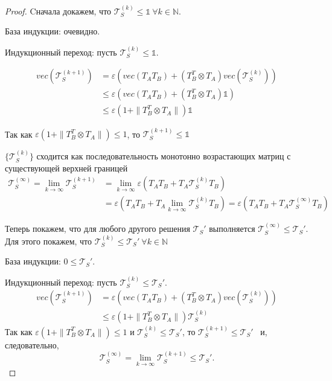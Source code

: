 \documentclass[12pt]{matmex-diploma-custom}
\begin{document}
\begin{proof}
Cначала докажем, что $\mathcal{T}_S^{(k)} \leq \mathds{1} \ \forall k \in \mathbb{N}$.

База индукции: очевидно.

Индукционный переход: пусть $\mathcal{T}_S^{(k)} \leq  \mathds{1}$.

\begin{align*}
    vec(\mathcal{T}_S^{(k+1)}) &= \varepsilon (vec(T_AT_B) + (T_B^T \otimes T_A)vec(\mathcal{T}_S^{(k)})) \\
    & \leq \varepsilon (vec(T_AT_B) + (T_B^T \otimes T_A) \mathds{1}) \\
    & \leq \varepsilon (1 + \| T_B^T \otimes T_A\|) \mathds{1}
\end{align*}

Так как $\varepsilon (1 + \| T_B^T \otimes T_A\|) \leq 1$, то $\mathcal{T}_S^{(k+1)} \leq \mathds{1}$

$\{ \mathcal{T}_S^{(k)}\}$ сходится как последовательность монотонно возрастающих матриц с существующей верхней границей 
\begin{align*}
\mathcal{T}_S^{(\infty)} = \lim_{k \to \infty} \mathcal{T}_S^{(k+1)} &= \lim_{k \to \infty}  \varepsilon (T_AT_B + T_A\mathcal{T}_S^{(k)} T_B) \\
&= \varepsilon (T_AT_B + T_A\lim_{k \to \infty}\mathcal{T}_S^{(k)} T_B) = \varepsilon (T_AT_B + T_A\mathcal{T}_S^{(\infty)} T_B)
\end{align*}

Теперь покажем, что для любого другого решения $\mathcal{T}_S'$ выполняется $\mathcal{T}_S^{(\infty)} \leq \mathcal{T}_S'$. Для этого покажем, что $\mathcal{T}_S^{(k)} \leq \mathcal{T}_S' \ \forall k \in \mathbb{N}$

База индукции: $0 \leq \mathcal{T}_S'$.

Индукционный переход: пусть $\mathcal{T}_S^{(k)} \leq  \mathcal{T}_S'$.
\begin{align*}
    vec(\mathcal{T}_S^{(k+1)}) &= \varepsilon (vec(T_AT_B) + (T_B^T \otimes T_A)vec(\mathcal{T}_S^{(k)})) \\
    & \leq \varepsilon (1 + \| T_B^T \otimes T_A\|) \mathcal{T}_S^{(k)}
\end{align*}
Так как $\varepsilon (1 + \| T_B^T \otimes T_A\|) \leq 1$ и $\mathcal{T}_S^{(k)} \leq  \mathcal{T}_S'$, то $\mathcal{T}_S^{(k+1)} \leq  \mathcal{T}_S'$ \ и, следовательно,
$$
\mathcal{T}_S^{(\infty)} = \lim_{k \to \infty} \mathcal{T}_S^{(k+1)} \leq \mathcal{T}_S'.
$$
\end{proof}
\end{document}
